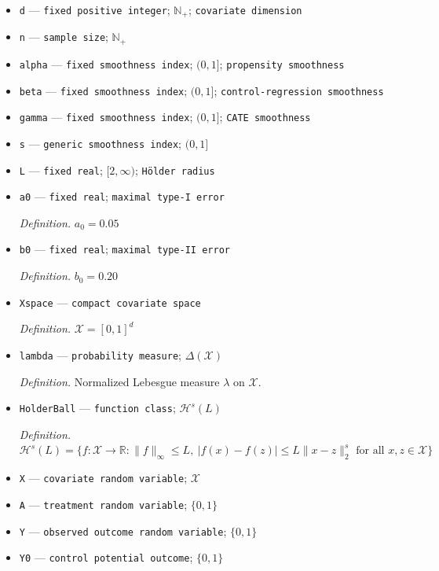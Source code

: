 \documentclass{article}
\begin{document}
\begin{itemize}
  \item \texttt{d} --- \texttt{fixed positive integer}; \(\mathbb N_{+}\); \texttt{covariate dimension}
  \item \texttt{n} --- \texttt{sample size}; \(\mathbb N_{+}\)
  \item \texttt{alpha} --- \texttt{fixed smoothness index}; \((0,1]\); \texttt{propensity smoothness}
  \item \texttt{beta} --- \texttt{fixed smoothness index}; \((0,1]\); \texttt{control-\allowbreak{}regression smoothness}
  \item \texttt{gamma} --- \texttt{fixed smoothness index}; \((0,1]\); \texttt{CATE smoothness}
  \item \texttt{s} --- \texttt{generic smoothness index}; \((0,1]\)
  \item \texttt{L} --- \texttt{fixed real}; \([2,\infty)\); \texttt{Hölder radius}
  \item \texttt{a0} --- \texttt{fixed real}; \texttt{maximal type-\allowbreak{}I error}
  \par\smallskip\noindent\emph{Definition.} \(a_0=0.05\)
  \item \texttt{b0} --- \texttt{fixed real}; \texttt{maximal type-\allowbreak{}II error}
  \par\smallskip\noindent\emph{Definition.} \(b_0=0.20\)
  \item \texttt{Xspace} --- \texttt{compact covariate space}
  \par\smallskip\noindent\emph{Definition.} \(\mathcal X=[0,1]^d\)
  \item \texttt{lambda} --- \texttt{probability measure}; \(\Delta(\mathcal X)\)
  \par\smallskip\noindent\emph{Definition.} Normalized Lebesgue measure \(\lambda\) on \(\mathcal X\).
  \item \texttt{HolderBall} --- \texttt{function class}; \(\mathcal H^s(L)\)
  \par\smallskip\noindent\emph{Definition.} \(\mathcal H^s(L)=\{f:\mathcal X\to\mathbb R:\|f\|_\infty\le L,\ |f(x)-f(z)|\le L\|x-z\|_2^s\text{ for all }x,z\in\mathcal X\}\)
  \item \texttt{X} --- \texttt{covariate random variable}; \(\mathcal X\)
  \item \texttt{A} --- \texttt{treatment random variable}; \(\{0,1\}\)
  \item \texttt{Y} --- \texttt{observed outcome random variable}; \(\{0,1\}\)
  \item \texttt{Y0} --- \texttt{control potential outcome}; \(\{0,1\}\)

\end{itemize}
\end{document}
